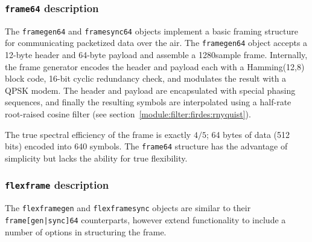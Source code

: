 \subsubsection{{\tt frame64} description}
\label{module:framing:frames:frame64}
The {\tt framegen64} and {\tt framesync64} objects implement a basic framing
structure for communicating packetized data over the air.
The {\tt framegen64} object accepts a 12-byte header and 64-byte payload and
assemble a 1280sample frame.
Internally, the frame generator encodes the header and payload each with a
Hamming(12,8) block code, 16-bit cyclic redundancy check, and modulates the
result with a QPSK modem.
The header and payload are encapsulated with special phasing sequences, and
finally the resulting symbols are interpolated using a half-rate root-raised
cosine filter (see section~\ref{module:filter:firdes:rnyquist}).

The true spectral efficiency of the frame is exactly $4/5$; 64 bytes of data
(512 bits) encoded into 640 symbols.
The {\tt frame64} structure has the advantage of simplicity but lacks the
ability for true flexibility.

\subsubsection{{\tt flexframe} description}
\label{module:framing:frames:flexframe}
The {\tt flexframegen} and {\tt flexframesync} objects are similar to their
{\tt frame[gen|sync]64} counterparts, however extend functionality to include
a number of options in structuring the frame.

